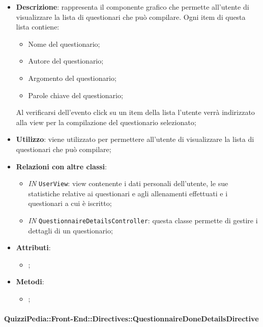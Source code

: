 \begin{itemize}
	\item \textbf{Descrizione}: rappresenta il componente grafico che permette all'utente di visualizzare la lista di questionari che può compilare. Ogni item di questa lista contiene:
		\begin{itemize}
			\item Nome del questionario;
			\item Autore del questionario;
			\item Argomento del questionario;
			\item Parole chiave del questionario;
		\end{itemize}
	Al verificarsi dell'evento click su un item della lista l'utente verrà indirizzato alla view per la compilazione del questionario selezionato;
	\item \textbf{Utilizzo}: viene utilizzato per permettere all'utente di visualizzare la lista di questionari che può compilare;
	\item \textbf{Relazioni con altre classi}: 
	\begin{itemize}
		\item \textit{IN} \texttt{UserView}: view contenente i dati personali dell'utente, le sue statistiche relative ai questionari e agli allenamenti effettuati e i questionari a cui è iscritto;
		\item \textit{IN} \texttt{QuestionnaireDetailsController}: questa classe permette di gestire i dettagli di un questionario; 
	\end{itemize}
	\item \textbf{Attributi}: 
	\begin{itemize}
		\item ;
	\end{itemize}
	\item \textbf{Metodi}: 
	\begin{itemize}
		\item ;
	\end{itemize}
\end{itemize}

\paragraph{QuizziPedia::Front-End::Directives::QuestionnaireDoneDetailsDirective}

\label{QuizziPedia::Front-End::Directives::QuestionnaireDoneDetailsDirective}

